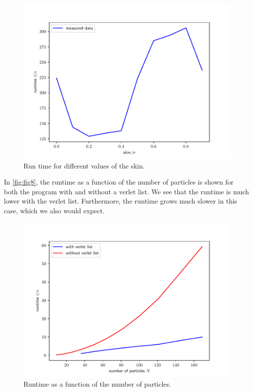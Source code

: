 \documentclass[a4paper,10pt,bibtotoc]{scrartcl}
\begin{document}
\begin{figure}[t]
 \includegraphics{Figure_skin.pdf}
 \caption{Run time for different values of the skin.}
 \label{fig:fig7}
\end{figure}

In \autoref{fig:fig8}, the runtime as a function of the number of particles is shown for both the program with and without a verlet list. 
We see that the runtime is much lower with the verlet list. 
Furthermore, the runtime grows much slower in this case, which we also would expect.

\begin{figure}[t]
 \includegraphics{withandiwthout.pdf}
 \caption{Runtime as a function of the number of particles.}
 \label{fig:fig8}
\end{figure}
\end{document}
